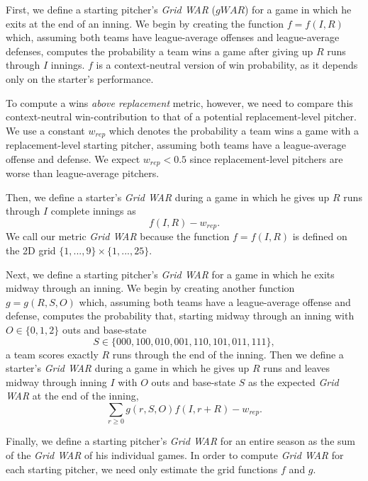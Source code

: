 \documentclass[12pt]{article}
\begin{document}
First, we define a starting pitcher's \textit{Grid WAR} ($gWAR$) for a game in which he exits at the end of an inning. We begin by creating the function $f=f(I,R)$ which, assuming both teams have league-average offenses and league-average defenses, computes the probability a team wins a game after giving up $R$ runs through $I$ innings. $f$ is a context-neutral version of win probability, as it depends only on the starter's performance. 

To compute a wins \textit{above replacement} metric, however, we need to compare this context-neutral win-contribution to that of a potential replacement-level pitcher. We use a constant $w_{rep}$ which denotes the probability a team wins a game with a replacement-level starting pitcher, assuming both teams have a league-average offense and defense. We expect $w_{rep} < 0.5$ since replacement-level pitchers are worse than league-average pitchers. 

Then, we define a starter's \textit{Grid WAR} during a game in which he gives up $R$ runs through $I$ complete innings as 
\begin{equation}
f(I, R) - w_{rep}.
\label{eqn:war_f}
\end{equation}
We call our metric \textit{Grid WAR} because the function $f=f(I,R)$ is defined on the 2D grid $\{1,...,9\} \times \{1,...,25\}$.

Next, we define a starting pitcher's \textit{Grid WAR} for a game in which he exits midway through an inning. We begin by creating another function $g=g(R,S,O)$ which, assuming both teams have a league-average offense and defense, computes the probability that, starting midway through an inning with $O \in \{0,1,2\}$ outs and base-state 
$$S \in \{000,100,010,001,110,101,011,111\},$$
a team scores exactly $R$ runs through the end of the inning. Then we define a starter's \textit{Grid WAR} during a game in which he gives up $R$ runs and leaves midway through inning $I$ with $O$ outs and base-state $S$ as the expected \textit{Grid WAR} at the end of the inning,
\begin{equation}
\sum_{r \geq 0} g(r,S,O) f(I,r+R) - w_{rep}.
\label{eqn:war_g}
\end{equation}

Finally, we define a starting pitcher's \textit{Grid WAR} for an entire season as the sum of the \textit{Grid WAR} of his individual games. In order to compute \textit{Grid WAR} for each starting pitcher, we need only estimate the grid functions $f$ and $g$.
\end{document}

